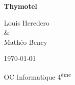\begin{titlepage}
  \begin{center}
    \Huge \textbf{Thymotel}

    \vspace{3cm}

    \LARGE Louis Heredero \\ \& \\ Mathéo Beney

    \vspace{3cm}

    \normalsize \today

    \vspace{5cm}

    \Large OC Informatique 4\textsuperscript{ème}
  \end{center}
\end{titlepage}

\tableofcontents
\listoffigures
